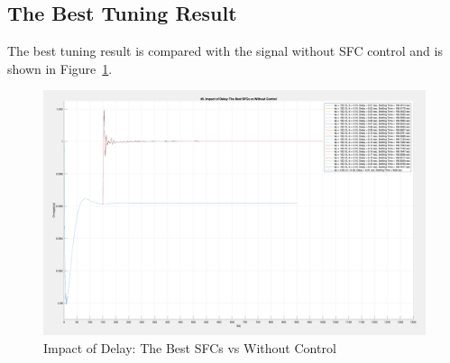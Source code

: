 \subsection{The Best Tuning Result} %

The best tuning result is compared with the signal without SFC control and is shown in Figure~\ref{5_4_2}.

\begin{figure}[htbp]
\centering
\includegraphics[width = .819\textwidth]{figure/5_4_2.png}
\caption{Impact of Delay: The Best SFCs vs Without Control}
\label{5_4_2}
\end{figure}